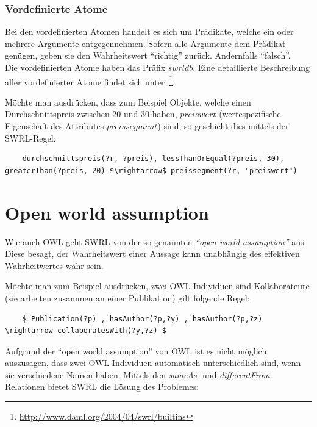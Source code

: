 \subsubsection{Vordefinierte Atome}
\label{ssubsec:swrl_aufbau_atomaretypen_vordefinierteatome}
Bei den vordefinierten Atomen handelt es sich um Prädikate, welche ein oder mehrere Argumente entgegennehmen. Sofern alle Argumente dem Prädikat genügen, geben sie den Wahrheitswert ``richtig'' zurück. Andernfalls ``falsch''.\\
Die vordefinierten Atome haben das Präfix $swrldb$. Eine detaillierte Beschreibung aller vordefinierter Atome findet sich unter~\footnote{\url{http://www.daml.org/2004/04/swrl/builtins}}.

Möchte man ausdrücken, dass zum Beispiel Objekte, welche einen Durchschnittspreis zwischen 20 und 30 haben, $preiswert$ (wertespezifische Eigenschaft des Attributes $preissegment$) sind, so geschieht dies mittels der SWRL-Regel:
\lstset{language=XML}
\begin{lstlisting}
    durchschnittspreis(?r, ?preis), lessThanOrEqual(?preis, 30), greaterThan(?preis, 20) $\rightarrow$ preissegment(?r, "preiswert")
\end{lstlisting}

\newpage

\section{Open world assumption}
\label{sec:swrl_openworldassumption}
Wie auch OWL geht SWRL von der so genannten \textit{``open world assumption''} aus. Diese besagt, der Wahrheitswert einer Aussage kann unabhängig des effektiven Wahrheitwertes wahr sein.

Möchte man zum Beispiel ausdrücken, zwei OWL-Individuen sind Kollaborateure (sie arbeiten zusammen an einer Publikation) gilt folgende Regel:

\lstset{language=XML}
\begin{lstlisting}
    $ Publication(?p) , hasAuthor(?p,?y) , hasAuthor(?p,?z) \rightarrow collaboratesWith(?y,?z) $
\end{lstlisting}

Aufgrund  der ``open world assumption'' von OWL ist es nicht möglich auszusagen, dass zwei OWL-Individuen automatisch unterschiedlich sind, wenn sie verschiedene Namen haben. Mittels den \textit{sameAs}- und \textit{differentFrom}-Relationen bietet SWRL die Lösung des Problemes:

